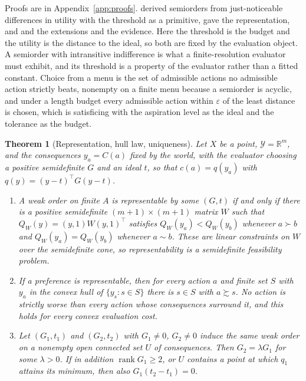 \documentclass{article}
\newtheorem{theorem}{Theorem}
\theoremstyle{definition}
\theoremstyle{remark}
\newcommand{\Y}{\mathcal{Y}}
\newcommand{\R}{\mathbb{R}}
\begin{document}
Proofs are in Appendix~\ref{app:proofs}.
\citet{luce1956} derived semiorders from just-noticeable differences in utility with the threshold as a primitive, \citet{scott1958} gave the representation, and \citet{fishburn1970} and \citet{tversky1969} the extensions and the evidence.
Here the threshold is the budget and the utility is the distance to the ideal, so both are fixed by the evaluation object.
A semiorder with intransitive indifference is what a finite-resolution evaluator must exhibit, and its threshold is a property of the evaluator rather than a fitted constant.
Choice from a menu is the set of admissible actions no admissible action strictly beats, nonempty on a finite menu because a semiorder is acyclic, and under a length budget every admissible action within $\varepsilon$ of the least distance is chosen, which is satisficing \citep{simon1955} with the aspiration level as the ideal and the tolerance as the budget.

\begin{theorem}[Representation, hull law, uniqueness]
\label{thm:repr}
Let $X$ be a point, $\Y=\R^{m}$, and the consequences $y_{a}=C(a)$ fixed by the world, with the evaluator choosing a positive semidefinite $G$ and an ideal $t$, so that $c(a)=q(y_{a})$ with $q(y)=(y-t)^{\top}G(y-t)$.
\begin{enumerate}
\item[(a)] A weak order on finite $A$ is representable by some $(G,t)$ if and only if there is a positive semidefinite $(m+1)\times(m+1)$ matrix $W$ such that $Q_{W}(y)=(y,1)W(y,1)^{\top}$ satisfies $Q_{W}(y_{a})<Q_{W}(y_{b})$ whenever $a\succ b$ and $Q_{W}(y_{a})=Q_{W}(y_{b})$ whenever $a\sim b$. These are linear constraints on $W$ over the semidefinite cone, so representability is a semidefinite feasibility problem.
\item[(b)] If a preference is representable, then for every action $a$ and finite set $S$ with $y_{a}$ in the convex hull of $\{y_{s}:s\in S\}$ there is $s\in S$ with $a\succsim s$. No action is strictly worse than every action whose consequences surround it, and this holds for every convex evaluation cost.
\item[(c)] Let $(G_{1},t_{1})$ and $(G_{2},t_{2})$ with $G_{1}\neq0$, $G_{2}\ne0$ induce the same weak order on a nonempty open connected set $U$ of consequences. Then $G_{2}=\lambda G_{1}$ for some $\lambda>0$. If in addition $\operatorname{rank}G_{1}\ge2$, or $U$ contains a point at which $q_{1}$ attains its minimum, then also $G_{1}(t_{2}-t_{1})=0$.
\end{enumerate}
\end{theorem}
\end{document}
